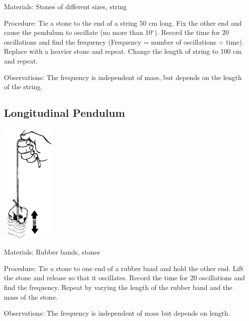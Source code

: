 \begin{multicols}{2}
\begin{description*}
\item[Materials:]{Stones of different sizes, string}
\item[Procedure:]{Tie a stone to the end of a string 50 cm long. Fix the other end and cause the pendulum to oscillate (no more than 10$^\circ$). Record the time for 20 oscillations and find the frequency (Frequency = number of oscillations $\div$ time). Replace with a heavier stone and repeat. Change the length of string to 100 cm and repeat.}
\item[Observations:]{The frequency is independent of mass, but depends on the length of the string.}
\end{description*}

\subsection{Longitudinal Pendulum}

\begin{center}
\includegraphics[width=0.2\textwidth]{./img/source/longitudinal-pendulum.png}
\end{center}

\begin{description*}
\item[Materials:]{Rubber bands, stones}
\item[Procedure:]{Tie a stone to one end of a rubber band and hold the other end. Lift the stone and release so that it oscillates. Record the time for 20 oscillations and find the frequency. Repeat by varying the length of the rubber band and the mass of the stone.}
\item[Observations:]{The frequency is independent of mass but depends on length.}
\end{description*}


\end{multicols}
